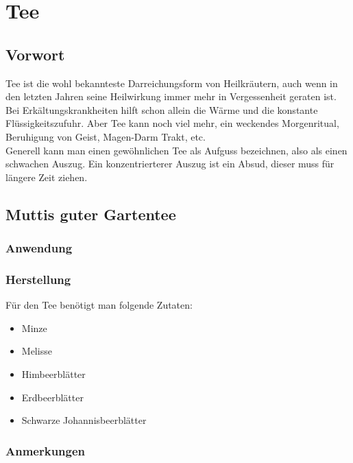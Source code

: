 \chapter{Tee}

\section{Vorwort}

Tee ist die wohl bekannteste Darreichungsform von Heilkräutern, auch wenn in den letzten Jahren seine Heilwirkung immer mehr in Vergessenheit geraten ist. Bei Erkältungskrankheiten hilft schon allein die Wärme und die konstante Flüssigkeitszufuhr. Aber Tee kann noch viel mehr, ein weckendes Morgenritual, Beruhigung von Geist, Magen-Darm Trakt, etc.\\

Generell kann man einen gewöhnlichen Tee als Aufguss bezeichnen, also als einen schwachen Auszug. Ein konzentrierterer Auszug ist ein Absud, dieser muss für längere Zeit ziehen.\\


\newpage



\section{Muttis guter Gartentee}


\subsection{Anwendung}


\subsection{Herstellung}

Für den Tee benötigt man folgende Zutaten:

\begin{itemize}
	\item Minze
	\item Melisse
	\item Himbeerblätter
	\item Erdbeerblätter
	\item Schwarze Johannisbeerblätter
\end{itemize}

\subsection{Anmerkungen}



